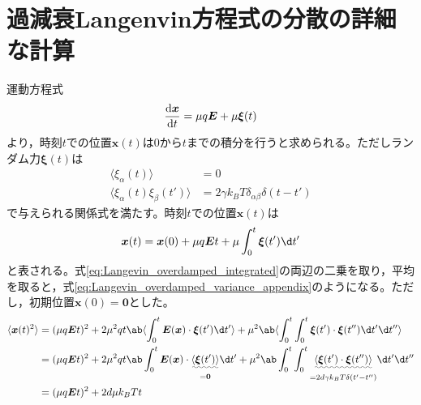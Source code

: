 \documentclass[autodetect-engine,dvi=dvipdfmx,a4paper,ja=standard,oneside,openany]{bxjsbook}
\begin{document}
\section{過減衰Langenvin方程式の分散の詳細な計算}
\label{sec:Langevin_cal}
運動方程式
\begin{equation}
  \odv{\bm{x}}{t}=\mu q\bm{E}+\mu\bm{\xi}(t)
  \label{eq:Langevin_overdamped}
\end{equation}
より，時刻$t$での位置$\bm{x}(t)$は0から$t$までの積分を行うと求められる。ただしランダム力$\bm{\xi}(t)$は
\begin{equation}
  \begin{split}
    \langle\xi_\alpha(t)\rangle              & =0                                             \\
    \langle\xi_\alpha(t)\xi_\beta(t')\rangle & =2\gamma k_B T\delta_{\alpha\beta}\delta(t-t')
  \end{split}
  \label{eq:random_force}
\end{equation}
で与えられる関係式を満たす。時刻$t$での位置$\bm{x}(t)$は
\begin{equation}
  \bm{x}(t)=\bm{x}(0)+\mu q\bm{E}t+\mu\int_0^t\bm{\xi}(t')\d t'
  \label{eq:Langevin_overdamped_integrated}
\end{equation}
と表される。式\ref{eq:Langevin_overdamped_integrated}の両辺の二乗を取り，平均を取ると，式\eqref{eq:Langevin_overdamped_variance_appendix}のようになる。ただし，初期位置$\bm{x}(0)=\bm{0}$とした。
\begin{equation}
  \begin{split}
    \langle\bm{x}(t)^2\rangle & =(\mu q \bm{E} t)^2+2\mu^2 q t\ab\langle\int_{0}^{t}\bm{E}(\bm{x})\cdot\bm{\xi}(t') \d t'\rangle+\mu^2\ab\langle\int_{0}^{t}\int_{0}^{t}\bm{\xi}(t')\cdot
    \bm{\xi}(t'') \d t' \d t''\rangle                                                                                                                                                                                                                                 \\
                              & =(\mu q \bm{E} t)^2+2\mu^2 q t\ab\int_{0}^{t}\bm{E}(\bm{x})\cdot\underset{=\bm{0}}{\uwave{\langle\bm{\xi}(t')\rangle}} \d t'+\mu^2\ab\int_{0}^{t}\int_{0}^{t}\underset{=2d\gamma k_B T\delta(t'-t'')}{\uwave{\langle\bm{\xi}(t')\cdot
    \bm{\xi}(t'')\rangle}} \d t' \d t''                                                                                                                                                                                                                               \\
                              & =(\mu q \bm{E} t)^2+2d\mu k_B T t                                                                                                                                                                                                     \\
  \end{split}
  \label{eq:Langevin_overdamped_variance_appendix}
\end{equation}
\end{document}
